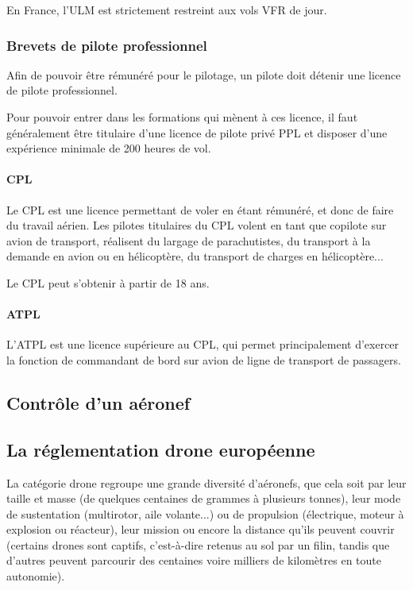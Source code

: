 	En France, l'ULM est strictement restreint aux vols VFR de jour.
	
	\subsubsection{Brevets de pilote professionnel}
	Afin de pouvoir être rémunéré pour le pilotage, un pilote doit détenir une licence de pilote professionnel.
	
	Pour pouvoir entrer dans les formations qui mènent à ces licence, il faut généralement être titulaire d'une licence de pilote privé PPL et disposer d'une expérience minimale de 200 heures de vol. 
	
	\paragraph{CPL}
	Le CPL  est une licence permettant de voler en étant rémunéré, et donc de faire du travail aérien. Les pilotes titulaires du CPL volent en tant que copilote sur avion de transport, réalisent du largage de parachutistes, du transport à la demande en avion ou en hélicoptère, du transport de charges en hélicoptère...
	
	Le CPL peut s'obtenir à partir de 18 ans.
	
	\paragraph{ATPL}
	L'ATPL  est une licence supérieure au CPL, qui permet principalement d'exercer la fonction de commandant de bord sur avion de ligne de transport de passagers.
	
	\subsection{Contrôle d'un aéronef}
	
	\subsection{La réglementation drone européenne}
	La catégorie drone regroupe une grande diversité d'aéronefs, que cela soit par leur taille et masse (de quelques centaines de grammes à plusieurs tonnes), leur mode de sustentation (multirotor, aile volante...) ou de propulsion (électrique, moteur à explosion ou réacteur), leur mission ou encore la distance qu'ils peuvent couvrir (certains drones sont captifs, c'est-à-dire retenus au sol par un filin, tandis que d'autres peuvent parcourir des centaines voire milliers de kilomètres en toute autonomie).

